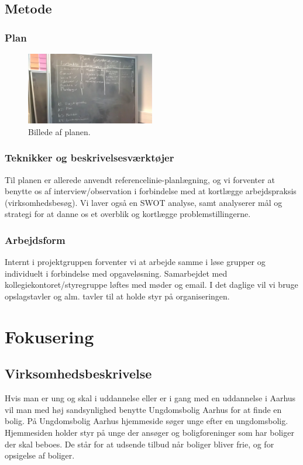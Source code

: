 \documentclass[12pt, a4paper]{report}
\begin{document}
\subsection{Metode}

\subsubsection{Plan}
\begin{figure}[h!]
\includegraphics[width=0.5\textwidth]{forundersoegelsesplan.jpg}
\caption{Billede af planen.}
\end{figure}

\subsubsection{Teknikker og beskrivelsesværktøjer}
Til planen er allerede anvendt referencelinie-planlægning, og vi forventer at benytte os af interview/observation i forbindelse med at kortlægge arbejdspraksis (virksomhedsbesøg). Vi laver også en SWOT analyse, samt analyserer mål og strategi for at danne os et overblik og kortlægge problemstillingerne.

\subsubsection{Arbejdsform}
Internt i projektgruppen forventer vi at arbejde samme i løse grupper og individuelt i forbindelse med opgaveløsning. Samarbejdet med kollegiekontoret/styregruppe løftes med møder og email.
I det daglige vil vi bruge opslagstavler og alm. tavler til at holde styr på organiseringen.

\section{Fokusering}
\subsection{Virksomhedsbeskrivelse}
Hvis man er ung og skal i uddannelse eller er i gang med en uddannelse i Aarhus vil man med høj sandsynlighed benytte Ungdomsbolig Aarhus for at finde en bolig. På Ungdomsbolig Aarhus hjemmeside søger unge efter en ungdomsbolig. Hjemmesiden holder styr på unge der ansøger og boligforeninger som har boliger der skal beboes. De står for at udsende tilbud når boliger bliver frie, og for opsigelse af boliger.
\end{document}
